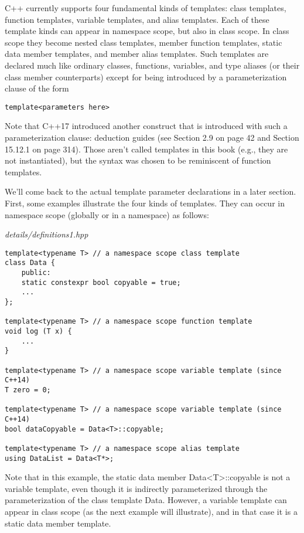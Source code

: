 
C++ currently supports four fundamental kinds of templates: class templates, function templates, variable templates, and alias templates. Each of these template kinds can appear in namespace scope, but also in class scope. In class scope they become nested class templates, member function templates, static data member templates, and member alias templates. Such templates are declared much like ordinary classes, functions, variables, and type aliases (or their class member counterparts) except for being introduced by a parameterization clause of the form

\begin{lstlisting}[style=styleCXX]
template<parameters here>
\end{lstlisting}

Note that C++17 introduced another construct that is introduced with such a parameterization clause: deduction guides (see Section 2.9 on page 42 and Section 15.12.1 on page 314). Those aren’t called templates in this book (e.g., they are not instantiated), but the syntax was chosen to be reminiscent of function templates.

We’ll come back to the actual template parameter declarations in a later section. First, some examples illustrate the four kinds of templates. They can occur in namespace scope (globally or in a namespace) as follows:

\noindent
\textit{details/definitions1.hpp}
\begin{lstlisting}[style=styleCXX]
template<typename T> // a namespace scope class template
class Data {
	public:
	static constexpr bool copyable = true;
	...
};

template<typename T> // a namespace scope function template
void log (T x) {
	...
}

template<typename T> // a namespace scope variable template (since C++14)
T zero = 0;

template<typename T> // a namespace scope variable template (since C++14)
bool dataCopyable = Data<T>::copyable;

template<typename T> // a namespace scope alias template
using DataList = Data<T*>;
\end{lstlisting}

Note that in this example, the static data member Data<T>::copyable is not a variable template, even though it is indirectly parameterized through the parameterization of the class template Data. However, a variable template can appear in class scope (as the next example will illustrate), and in that case it is a static data member template.

